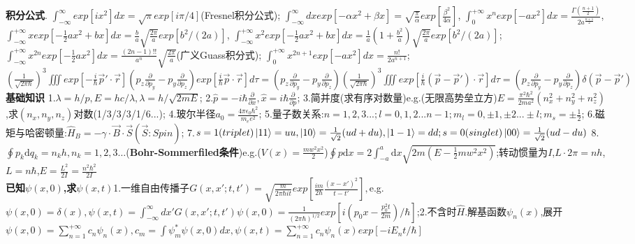 \documentclass[UTF8,a4paper,7pt,twocolumn]{ctexart}
\begin{document}
      \textbf{积分公式}.
      $\int_{-\infty}^{\infty}exp[ix^2]dx=\sqrt{\pi}exp[i\pi/4]$(Fresnel积分公式);
      $\int_{-\infty}^{\infty}dxexp[-\alpha x^2+\beta x]=\sqrt{\frac{\pi}{\alpha}}exp[\frac{\beta^2}{4\alpha}]$,
      $\int_{0}^{+\infty}x^{n}exp[-ax^{2}]dx=\frac{\Gamma(\frac{n+1}{2})}{2a^{\frac{n+1}{2}}}$,
      $\int_{-\infty}^{+\infty}xexp[-\frac{1}{2}ax^2+bx]dx=\frac{b}{a}\sqrt{\frac{2\pi}{a}}exp[b^2/(2a)]$,
      $\int_{-\infty}^{+\infty}x^{2}exp[-\frac{1}{2}ax^2+bx]dx=\frac{1}{a}(1+\frac{b^{2}}{a})\sqrt{\frac{2\pi}{a}}exp[b^{2}/(2a)]$;
      $\int_{-\infty}^{+\infty}x^{2n}exp[-\frac{1}{2}ax^{2}]dx=\frac{(2n-1)!!}{a^{n}}\sqrt{\frac{2\pi}{a}}$(广义Guass积分式);
      $\int_{0}^{+\infty}x^{2n+1}exp[-ax^{2}]dx=\frac{n!}{2a^{n+1}}$;
      $(\frac{1}{\sqrt{2\pi\hbar}})^{3}\iiint exp[-\frac{i}{\hbar}\vec{p}'\cdot\vec{r}](p_{z}\frac{\partial}{\partial p_{y}}-p_{y}\frac{\partial}{\partial p_{z}})exp[\frac{i}{\hbar}\vec{p}\cdot\vec{r}]d\tau=(p_{z}\frac{\partial}{\partial p_{y}}-p_{y}\frac{\partial}{\partial p_{z}})(\frac{1}{\sqrt{2\pi\hbar}})^{3}\iiint exp[\frac{i}{\hbar}(\vec{p}-\vec{p}')\cdot\vec{r}]d\tau=(p_{z}\frac{\partial}{\partial p_{y}}-p_{y}\frac{\partial}{\partial p_{z}})\delta(\vec{p}-\vec{p}')$\\
      \textbf{基础知识}
      1.$\lambda=h/p,E=hc/\lambda,\lambda=h/\sqrt{2mE}$;
      2.$\hat{p}=-i\hbar\frac{\partial}{\partial x},\hat{x}=i\hbar\frac{\partial}{\partial p}$;
      3.简并度(求有序对数量)e.g.(无限高势垒立方)$E=\frac{\pi^{2}\hbar^{2}}{2ma^2}(n_{x}^{2}+n_{y}^{2}+n_{z}^{2})$,求$(n_{x},n_{y},n_{z})$对数(1/3/3/3/1/6...);
      4.玻尔半径$a_{0}=\frac{4\pi\epsilon_{0}\hbar^{2}}{m_{e}e^{2}}$;
      5.量子数关系:$n=1,2,3...;l=0,1,2...n-1;m_{l}=0,\pm 1,\pm 2...\pm l;m_{s}=\pm\frac{1}{2}$;
      6.磁矩与哈密顿量:$\hat{H}_{B}=-\gamma\cdot\vec{B}\cdot\vec{S}(\vec{S}:Spin)$;
      7.$s=1(triplet)\ket{11}=uu,\ket{10}=\frac{1}{\sqrt{2}}(ud+du),\ket{1-1}=dd;s=0(singlet)\ket{00}=\frac{1}{\sqrt{2}}(ud-du)$
      8.$\oint p_{k}\mathrm{d}q_{k}=n_{k}h,n_{k}=1,2,3\dots$(\textbf{Bohr-Sommerfiled条件})e.g.($V(x)=\frac{mw^2x^2}{2}$)$\oint p\mathrm{d}x=2\int_{-a}^{a}\mathrm{d}x\sqrt{2m(E-\frac{1}{2}mw^2x^2)}$;转动惯量为$I$,$L\cdot 2\pi=nh$,$L=n\hbar$,$E=\frac{L^2}{2I}=\frac{n^2\hbar^2}{2I}$\\
      \textbf{已知$\psi(x,0)$,求$\psi(x,t)$}1.一维自由传播子$G(x,x';t,t')=\sqrt{\frac{m}{2\pi\hbar it}}exp[\frac{im}{2\hbar}\frac{(x-x')^2}{t-t'}],$e.g.$\psi(x,0)=\delta(x),\psi(x,t)=\int_{-\infty}^{\infty}dx'G(x,x';t,t')\psi(x,0)=\frac{1}{(2\pi\hbar)^{1/2}}exp[i(p_{0}x-\frac{p_{0}^2t}{2m})/\hbar]$;2.不含时$\hat{H}$.解基函数$\psi_{n}(x)$,展开$\psi(x,0)=\sum_{n=1}^{+\infty}c_{n}\psi_{n}(x),c_{m}=\int\psi_{m}^{*}\psi(x,0)dx,\psi(x,t)=\sum_{n=1}^{+\infty}c_{n}\psi_{n}(x)exp[-iE_{n}t/\hbar]$\\
\end{document}
